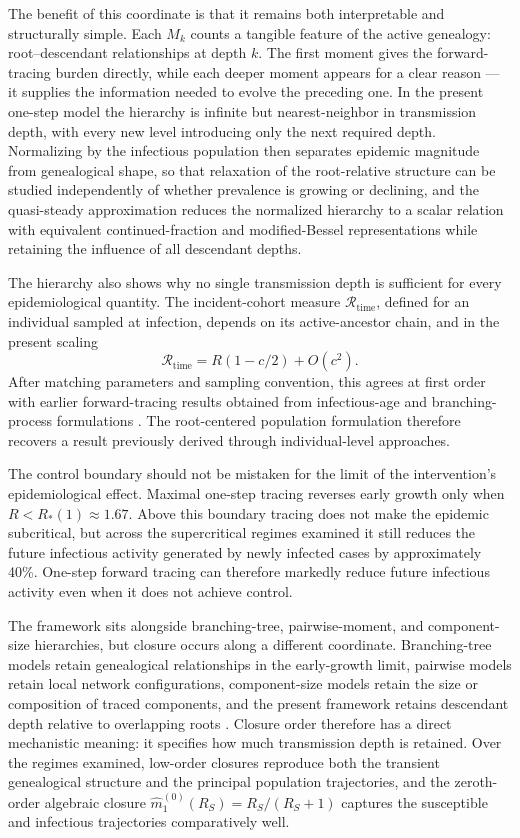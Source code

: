 \documentclass[review,12pt]{elsarticle}
\numberwithin{equation}{section}
\theoremstyle{remark}
\begin{document}
The benefit of this coordinate is that it remains both interpretable and structurally simple. Each $M_k$ counts a tangible feature of the active genealogy: root--descendant relationships at depth $k$. The first moment gives the forward-tracing burden directly, while each deeper moment appears for a clear reason --- it supplies the information needed to evolve the preceding one. In the present one-step model the hierarchy is infinite but nearest-neighbor in transmission depth, with every new level introducing only the next required depth. Normalizing by the infectious population then separates epidemic magnitude from genealogical shape, so that relaxation of the root-relative structure can be studied independently of whether prevalence is growing or declining, and the quasi-steady approximation reduces the normalized hierarchy to a scalar relation with equivalent continued-fraction and modified-Bessel representations while retaining the influence of all descendant depths.

The hierarchy also shows why no single transmission depth is sufficient for every epidemiological quantity. The incident-cohort measure $\mathcal R_{\mathrm{time}}$, defined for an individual sampled at infection, depends on its active-ancestor chain, and in the present scaling
\begin{equation}
\mathcal R_{\mathrm{time}} = R(1-c/2) + O(c^2).
\label{eq:8.1}
\end{equation}
After matching parameters and sampling convention, this agrees at first order with earlier forward-tracing results obtained from infectious-age and branching-process formulations \cite{muller2016,okolie2020}. The root-centered population formulation therefore recovers a result previously derived through individual-level approaches.

The control boundary should not be mistaken for the limit of the intervention's epidemiological effect. Maximal one-step tracing reverses early growth only when $R<R_*(1)\approx1.67$. Above this boundary tracing does not make the epidemic subcritical, but across the supercritical regimes examined it still reduces the future infectious activity generated by newly infected cases by approximately 40\%. One-step forward tracing can therefore markedly reduce future infectious activity even when it does not achieve control.

The framework sits alongside branching-tree, pairwise-moment, and component-size hierarchies, but closure occurs along a different coordinate. Branching-tree models retain genealogical relationships in the early-growth limit, pairwise models retain local network configurations, component-size models retain the size or composition of traced components, and the present framework retains descendant depth relative to overlapping roots \cite{muller2000,taylor2012,sharkey2015b,zhang2022}. Closure order therefore has a direct mechanistic meaning: it specifies how much transmission depth is retained. Over the regimes examined, low-order closures reproduce both the transient genealogical structure and the principal population trajectories, and the zeroth-order algebraic closure $\widehat m_1^{(0)}(R_S)=R_S/(R_S+1)$ captures the susceptible and infectious trajectories comparatively well.
\end{document}
